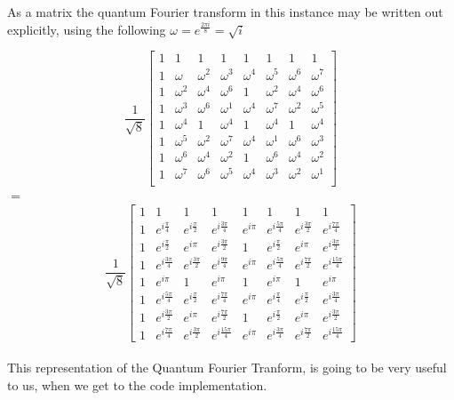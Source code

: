 \documentclass[inscr,ack,preface]{diphdthesis}
\begin{document}
As a matrix the quantum Fourier transform in this instance may be written out explicitly, using the following  \Large$\omega= e^{\frac{2\pi i}{8}} = \sqrt{i}$ \normalsize \cite{niel}

\Large

\[
\frac{1}{\sqrt{8}}
\begin{bmatrix}
1 & 1 & 1 & 1 & 1 & 1 & 1 & 1 \\
1 & \omega & \omega^2 & \omega^3 & \omega^4 & \omega^5 & \omega^6 & \omega^7 \\
1 & \omega^2 & \omega^4 & \omega^6 & 1 & \omega^2 & \omega^4 & \omega^6 \\
1 & \omega^3 & \omega^6 & \omega^1 & \omega^4 & \omega^7 & \omega^2 & \omega^5 \\
1 & \omega^4 & 1 & \omega^4 & 1 & \omega^4 & 1 & \omega^4 \\
1 & \omega^5 & \omega^2 & \omega^7 & \omega^4 & \omega^1 & \omega^6 & \omega^3 \\
1 & \omega^6 & \omega^4 & \omega^2 & 1 & \omega^6 & \omega^4 & \omega^2 \\
1 & \omega^7 & \omega^6 & \omega^5 & \omega^4 & \omega^3 & \omega^2 & \omega^1 \\
\end{bmatrix}
\]
$=$\[
\frac{1}{\sqrt{8}} \begin{bmatrix}
1 & 1 & 1 & 1 & 1 & 1 & 1 & 1 \\
1 & e^{i\frac{\pi}{4}} & e^{i\frac{\pi}{2}} & e^{i\frac{3\pi}{4}} & e^{i\pi} & e^{i\frac{5\pi}{4}} & e^{i\frac{3\pi}{2}} & e^{i\frac{7\pi}{4}} \\
1 & e^{i\frac{\pi}{2}} & e^{i\pi} & e^{i\frac{3\pi}{2}} & 1 & e^{i\frac{\pi}{2}} & e^{i\pi} & e^{i\frac{3\pi}{2}} \\
1 & e^{i\frac{3\pi}{4}} & e^{i\frac{3\pi}{2}} & e^{i\frac{9\pi}{4}} & e^{i\pi} & e^{i\frac{5\pi}{4}} & e^{i\frac{7\pi}{2}} & e^{i\frac{15\pi}{4}} \\
1 & e^{i\pi} & 1 & e^{i\pi} & 1 & e^{i\pi} & 1 & e^{i\pi} \\
1 & e^{i\frac{5\pi}{4}} & e^{i\frac{\pi}{2}} & e^{i\frac{7\pi}{4}} & e^{i\pi} & e^{i\frac{\pi}{4}} & e^{i\frac{\pi}{2}} & e^{i\frac{3\pi}{4}} \\
1 & e^{i\frac{3\pi}{2}} & e^{i\pi} & e^{i\frac{7\pi}{2}} & 1 & e^{i\frac{\pi}{2}} & e^{i\pi} & e^{i\frac{3\pi}{2}} \\
1 & e^{i\frac{7\pi}{4}} & e^{i\frac{3\pi}{2}} & e^{i\frac{15\pi}{4}} & e^{i\pi} & e^{i\frac{3\pi}{4}} & e^{i\frac{7\pi}{2}} & e^{i\frac{15\pi}{4}}
\end{bmatrix}
\]
\normalsize 
\\This representation of the Quantum Fourier Tranform, is going to be very useful to us, when we get to the code implementation.
\end{document}
